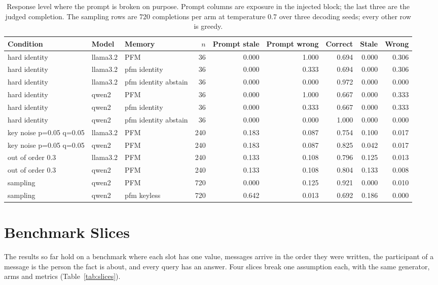 \documentclass{article} %
\begin{document}
\begin{table}[h]
\centering
\scriptsize
\setlength{\tabcolsep}{3.5pt}
\begin{tabular}{@{}lllrrrrrr@{}}
\toprule
Condition & Model & Memory & $n$ & Prompt stale & Prompt wrong & Correct & Stale & Wrong \\
\midrule
hard identity & llama3.2 & PFM & 36 & 0.000 & 1.000 & 0.694 & 0.000 & 0.306 \\
hard identity & llama3.2 & pfm identity & 36 & 0.000 & 0.333 & 0.694 & 0.000 & 0.306 \\
hard identity & llama3.2 & pfm identity abstain & 36 & 0.000 & 0.000 & 0.972 & 0.000 & 0.000 \\
hard identity & qwen2 & PFM & 36 & 0.000 & 1.000 & 0.667 & 0.000 & 0.333 \\
hard identity & qwen2 & pfm identity & 36 & 0.000 & 0.333 & 0.667 & 0.000 & 0.333 \\
hard identity & qwen2 & pfm identity abstain & 36 & 0.000 & 0.000 & 1.000 & 0.000 & 0.000 \\
key noise p=0.05 q=0.05 & llama3.2 & PFM & 240 & 0.183 & 0.087 & 0.754 & 0.100 & 0.017 \\
key noise p=0.05 q=0.05 & qwen2 & PFM & 240 & 0.183 & 0.087 & 0.825 & 0.042 & 0.017 \\
out of order 0.3 & llama3.2 & PFM & 240 & 0.133 & 0.108 & 0.796 & 0.125 & 0.013 \\
out of order 0.3 & qwen2 & PFM & 240 & 0.133 & 0.108 & 0.804 & 0.133 & 0.008 \\
sampling & qwen2 & PFM & 720 & 0.000 & 0.125 & 0.921 & 0.000 & 0.010 \\
sampling & qwen2 & pfm keyless & 720 & 0.642 & 0.013 & 0.692 & 0.186 & 0.000 \\
\bottomrule
\end{tabular}
\caption{Response level where the prompt is broken on purpose. Prompt columns are exposure in the injected block; the last three are the judged completion. The sampling rows are 720 completions per arm at temperature 0.7 over three decoding seeds; every other row is greedy.}
\label{tab:llm_slices}
\end{table}

\section{Benchmark Slices}
\label{app:slices}\label{sec:slices}

The results so far hold on a benchmark where each slot has one value, messages arrive in the order they were written, the participant of a message is the person the fact is about, and every query has an answer. Four slices break one assumption each, with the same generator, arms and metrics (Table~\ref{tab:slices}).
\end{document}
